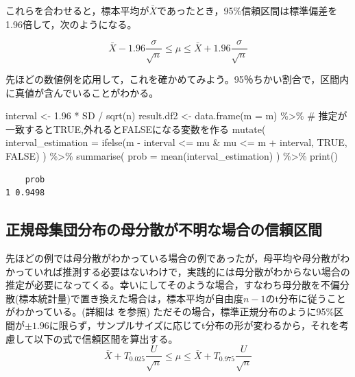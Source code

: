 \documentclass[
  a4paper,
]{ltjsbook}
\newenvironment{Shaded}{\begin{snugshade}}{\end{snugshade}}
\newcommand{\AttributeTok}[1]{\textcolor[rgb]{0.40,0.45,0.13}{#1}}
\newcommand{\CommentTok}[1]{\textcolor[rgb]{0.37,0.37,0.37}{#1}}
\newcommand{\ConstantTok}[1]{\textcolor[rgb]{0.56,0.35,0.01}{#1}}
\newcommand{\FloatTok}[1]{\textcolor[rgb]{0.68,0.00,0.00}{#1}}
\newcommand{\FunctionTok}[1]{\textcolor[rgb]{0.28,0.35,0.67}{#1}}
\newcommand{\NormalTok}[1]{\textcolor[rgb]{0.00,0.23,0.31}{#1}}
\newcommand{\OtherTok}[1]{\textcolor[rgb]{0.00,0.23,0.31}{#1}}
\newcommand{\SpecialCharTok}[1]{\textcolor[rgb]{0.37,0.37,0.37}{#1}}
\begin{document}
これらを合わせると，標本平均が\(\bar{X}\)であったとき，95\%信頼区間は標準偏差を1.96倍して，次のようになる。

\[ \bar{X} - 1.96 \frac{\sigma}{\sqrt{n}} \le \mu \le \bar{X} + 1.96 \frac{\sigma}{\sqrt{n}} \]

先ほどの数値例を応用して，これを確かめてみよう。95％ちかい割合で，区間内に真値が含んでいることがわかる。

\begin{Shaded}
\begin{Highlighting}[]
\NormalTok{interval }\OtherTok{\textless{}{-}} \FloatTok{1.96} \SpecialCharTok{*}\NormalTok{ SD }\SpecialCharTok{/} \FunctionTok{sqrt}\NormalTok{(n)}
\NormalTok{result.df2 }\OtherTok{\textless{}{-}} \FunctionTok{data.frame}\NormalTok{(}\AttributeTok{m =}\NormalTok{ m) }\SpecialCharTok{\%\textgreater{}\%}
  \CommentTok{\# 推定が一致するとTRUE,外れるとFALSEになる変数を作る}
  \FunctionTok{mutate}\NormalTok{(}
    \AttributeTok{interval\_estimation =} \FunctionTok{ifelse}\NormalTok{(m }\SpecialCharTok{{-}}\NormalTok{ interval  }\SpecialCharTok{\textless{}=}\NormalTok{ mu }\SpecialCharTok{\&}\NormalTok{ mu }\SpecialCharTok{\textless{}=}\NormalTok{ m }\SpecialCharTok{+}\NormalTok{ interval, }\ConstantTok{TRUE}\NormalTok{, }\ConstantTok{FALSE}\NormalTok{)}
\NormalTok{  ) }\SpecialCharTok{\%\textgreater{}\%} 
  \FunctionTok{summarise}\NormalTok{(}
    \AttributeTok{prob =} \FunctionTok{mean}\NormalTok{(interval\_estimation)}
\NormalTok{  ) }\SpecialCharTok{\%\textgreater{}\%} \FunctionTok{print}\NormalTok{()}
\end{Highlighting}
\end{Shaded}

\begin{verbatim}
    prob
1 0.9498
\end{verbatim}

\subsection{正規母集団分布の母分散が不明な場合の信頼区間}\label{ux6b63ux898fux6bcdux96c6ux56e3ux5206ux5e03ux306eux6bcdux5206ux6563ux304cux4e0dux660eux306aux5834ux5408ux306eux4fe1ux983cux533aux9593}

先ほどの例では母分散がわかっている場合の例であったが，母平均や母分散がわかっていれば推測する必要はないわけで，実践的には母分散がわからない場合の推定が必要になってくる。幸いにしてそのような場合，すなわち母分散を不偏分散(標本統計量)で置き換えた場合は，標本平均が自由度\(n-1\)のt分布に従うことがわかっている。(詳細は
\textcite{kosugi2023} を参照)
ただその場合，標準正規分布のように95\%区間が\(\pm 1.96\)に限らず，サンプルサイズに応じてt分布の形が変わるから，それを考慮して以下の式で信頼区間を算出する。
\[ \bar{X} + T_{0.025}\frac{U}{\sqrt{n}} \le \mu \le \bar{X} + T_{0.975}\frac{U}{\sqrt{n}} \]
\end{document}
